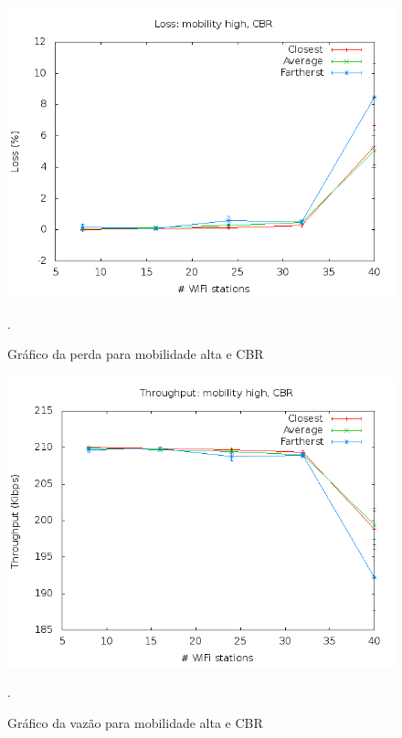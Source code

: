 \documentclass[12pt,twoside,a4paper]{article}
\begin{document}
\begin{figure}[H]
\centering
\includegraphics[scale=0.5]{mo818-loss-mob-2-traf-0}
\caption{Gráfico da perda para mobilidade alta e CBR}.
\label{fig:perda-m2-t0}
\end{figure}

\begin{figure}[H]
\centering
\includegraphics[scale=0.5]{mo818-throughput-mob-2-traf-0}
\caption{Gráfico da vazão para mobilidade alta e CBR}.
\label{fig:vazao-m2-t0}
\end{figure}
\end{document}

